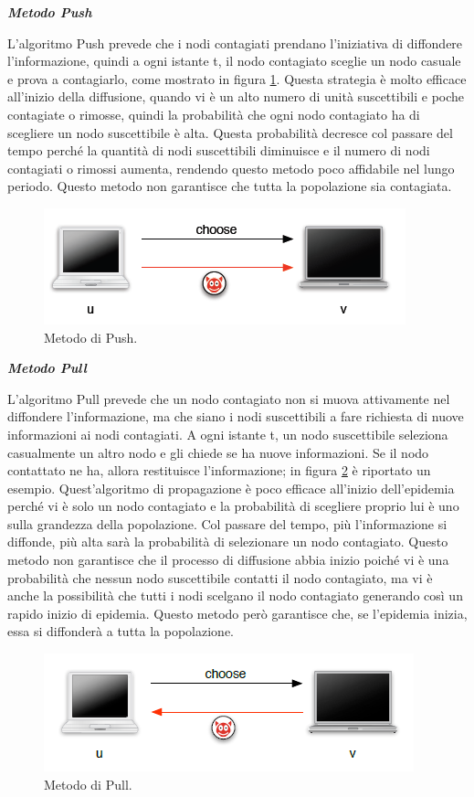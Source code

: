 \noindent\textbf{\textit{Metodo Push}}

L'algoritmo Push prevede che i nodi contagiati prendano l’iniziativa di diffondere l’informazione, quindi a ogni istante t, il nodo contagiato sceglie un nodo casuale e prova a contagiarlo, come mostrato in figura \ref{fig:push}. Questa strategia è molto efficace all’inizio della diffusione, quando vi è un alto numero di unità suscettibili e poche contagiate o rimosse, quindi la probabilità che ogni nodo contagiato ha di scegliere un nodo suscettibile è alta. Questa probabilità decresce col passare del tempo perché la quantità di nodi suscettibili diminuisce e il numero di nodi contagiati o rimossi aumenta, rendendo questo metodo poco affidabile nel lungo periodo. Questo metodo non garantisce che tutta la popolazione sia contagiata.
\bigskip
\begin{figure}[bh]
\centering
\includegraphics[width=0.7\linewidth,keepaspectratio]{Images/algoritmi_gossip/push}
\caption[Metodo di Push]{Metodo di Push.}
\label{fig:push}
\end{figure}
\bigskip


\noindent\textbf{\textit{Metodo Pull}}

L'algoritmo Pull prevede che un nodo contagiato non si muova attivamente nel diffondere l'informazione, ma che siano i nodi suscettibili a fare richiesta di nuove informazioni ai nodi contagiati. A ogni istante t, un nodo suscettibile seleziona casualmente un altro nodo e gli chiede se ha nuove informazioni. Se il nodo contattato ne ha, allora restituisce l'informazione; in figura \ref{fig:pull} è riportato un esempio. Quest'algoritmo di propagazione è poco efficace all'inizio dell'epidemia perché vi è solo un nodo contagiato e la probabilità di scegliere proprio lui è uno sulla grandezza della popolazione. Col passare del tempo, più l'informazione si diffonde, più alta sarà la probabilità di selezionare un nodo contagiato. Questo metodo non garantisce che il processo di diffusione abbia inizio poiché vi è una probabilità che nessun nodo suscettibile contatti il nodo contagiato, ma vi è anche la possibilità che tutti i nodi scelgano il nodo contagiato generando così un rapido inizio di epidemia. Questo metodo però garantisce che, se l'epidemia inizia, essa si diffonderà a tutta la popolazione.
\bigskip
\begin{figure}[h]
	\centering
	\includegraphics[width=0.7\linewidth,keepaspectratio]{Images/algoritmi_gossip/pull}
	\caption[Metodo di Pull]{Metodo di Pull.}
	\label{fig:pull}
\end{figure}
\bigskip


